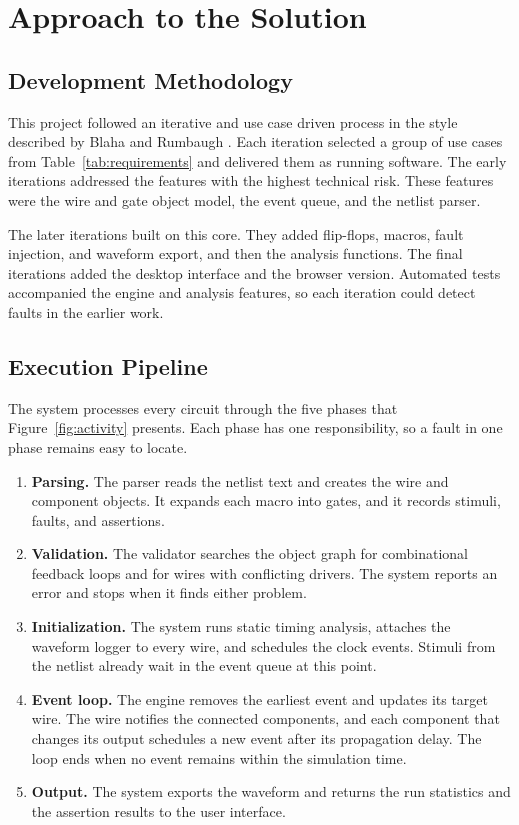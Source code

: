 \section{Approach to the Solution}
\label{sec:approach}

\subsection{Development Methodology}

This project followed an iterative and use case driven process in the style described by Blaha and Rumbaugh .
Each iteration selected a group of use cases from Table~\ref{tab:requirements} and delivered them as running software.
The early iterations addressed the features with the highest technical risk.
These features were the wire and gate object model, the event queue, and the netlist parser.

The later iterations built on this core.
They added flip-flops, macros, fault injection, and waveform export, and then the analysis functions.
The final iterations added the desktop interface and the browser version.
Automated tests accompanied the engine and analysis features, so each iteration could detect faults in the earlier work.

\subsection{Execution Pipeline}

The system processes every circuit through the five phases that Figure~\ref{fig:activity} presents.
Each phase has one responsibility, so a fault in one phase remains easy to locate.

\begin{enumerate}
\item \textbf{Parsing.} The parser reads the netlist text and creates the wire and component objects. It expands each macro into gates, and it records stimuli, faults, and assertions.
\item \textbf{Validation.} The validator searches the object graph for combinational feedback loops and for wires with conflicting drivers. The system reports an error and stops when it finds either problem.
\item \textbf{Initialization.} The system runs static timing analysis, attaches the waveform logger to every wire, and schedules the clock events. Stimuli from the netlist already wait in the event queue at this point.
\item \textbf{Event loop.} The engine removes the earliest event and updates its target wire. The wire notifies the connected components, and each component that changes its output schedules a new event after its propagation delay. The loop ends when no event remains within the simulation time.
\item \textbf{Output.} The system exports the waveform and returns the run statistics and the assertion results to the user interface.
\end{enumerate}

